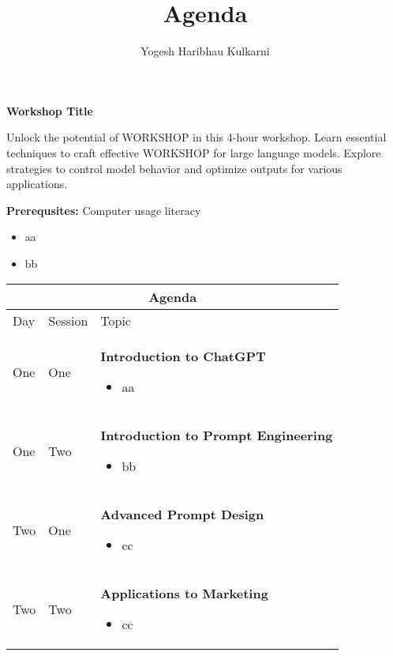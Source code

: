 \documentclass[a4paper, 11pt]{article}
\title{Agenda}
\author{Yogesh Haribhau Kulkarni}
\begin{document}
\pagestyle{mystyle}

\makebox[\linewidth]{}
\begin{center} 
\textbf{\Large Workshop Title}
\end{center}
\makebox[\linewidth]{} %

Unlock the potential of WORKSHOP in this 4-hour workshop. 
Learn essential techniques to craft effective WORKSHOP for large language models. 
Explore strategies to control model behavior and optimize outputs for various applications.

\makebox[\linewidth]{}

\textbf{Prerequsites:} Computer usage literacy
\begin{itemize}[topsep=0pt, partopsep=0pt, itemsep=0pt, parsep=0pt]
\item aa
\item bb
\end{itemize}

\makebox[\linewidth]{}

\begin{center} 
\begin{tabular}{ |p{1cm}|p{1cm}||p{10cm}|  }
 \hline
 \multicolumn{3}{|c|}{\textbf{\large Agenda}} \\
 \hline
Day & Session & Topic\\
 \hline
 One   &  One    &  \textbf{Introduction to ChatGPT}
\begin{itemize}[topsep=0pt, partopsep=0pt, itemsep=0pt, parsep=0pt]
\item aa
\end{itemize} 
\\
One &   Two  &   \textbf{Introduction to Prompt Engineering}
 \begin{itemize}[topsep=0pt, partopsep=0pt, itemsep=0pt, parsep=0pt]
\item bb
\end{itemize} 
\\
Two   &  One    & \textbf{Advanced Prompt Design}
 \begin{itemize}[topsep=0pt, partopsep=0pt, itemsep=0pt, parsep=0pt]
\item cc
\end{itemize} 
\\
Two  &   Two  & \textbf{Applications to Marketing}
 \begin{itemize}[topsep=0pt, partopsep=0pt, itemsep=0pt, parsep=0pt]
\item cc
\end{itemize} 
\\
 \hline
\end{tabular}
\end{center}
\end{document}
